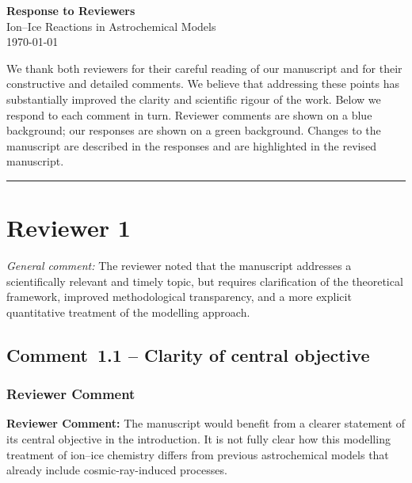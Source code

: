 \documentclass[12pt]{article}
\newcommand{\reviewlabel}{\textbf{\textcolor{commentframe}{Reviewer Comment:}}}
\begin{document}
\begin{center}
  {\LARGE \textbf{Response to Reviewers}} \\[0.5em]
  {\large Ion--Ice Reactions in Astrochemical Models} \\[0.5em]
  {\normalsize \today}
\end{center}

\bigskip

We thank both reviewers for their careful reading of our manuscript and for
their constructive and detailed comments. We believe that addressing these
points has substantially improved the clarity and scientific rigour of the
work. Below we respond to each comment in turn. Reviewer comments are shown
on a \textcolor{commentframe}{blue} background; our responses are shown on a
\textcolor{responseframe}{green} background. Changes to the manuscript are
described in the responses and are highlighted in the revised manuscript.

\bigskip
\hrule
\bigskip

\section{Reviewer 1}

\textit{General comment:} The reviewer noted that the manuscript addresses a
scientifically relevant and timely topic, but requires clarification of the
theoretical framework, improved methodological transparency, and a more
explicit quantitative treatment of the modelling approach.

\subsection{Comment~1.1 -- Clarity of central objective}

\subsubsection{Reviewer Comment}
\begin{reviewerbox}
\reviewlabel{} The manuscript would benefit from a clearer statement of its
central objective in the introduction. It is not fully clear how this
modelling treatment of ion--ice chemistry differs from previous astrochemical
models that already include cosmic-ray-induced processes.
\end{reviewerbox}
\end{document}

